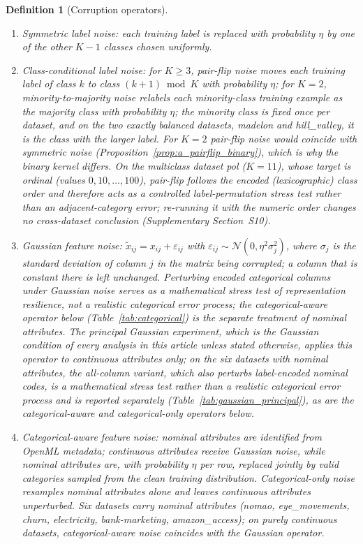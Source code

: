 \documentclass[pdflatex,sn-mathphys]{sn-jnl}
\theoremstyle{thmstyleone}
\theoremstyle{thmstyletwo}
\theoremstyle{thmstylethree}
\newtheorem{definition}{Definition}
\begin{document}
\begin{definition}[Corruption operators]\label{def:operators}
\begin{enumerate}
\item \emph{Symmetric label noise}: each training label is replaced with probability $\eta$ by one of the other $K-1$ classes chosen uniformly.
\item \emph{Class-conditional label noise}: for $K\ge3$, \emph{pair-flip} noise moves each training label of class $k$ to class $(k+1)\bmod K$ with probability $\eta$; for $K=2$, \emph{minority-to-majority} noise relabels each minority-class training example as the majority class with probability $\eta$; the minority class is fixed once per dataset, and on the two exactly balanced datasets, madelon and hill\_valley, it is the class with the larger label. For $K=2$ pair-flip noise would coincide with symmetric noise (Proposition~\ref{prop:a_pairflip_binary}), which is why the binary kernel differs. On the multiclass dataset pol ($K=11$), whose target is ordinal (values $0,10,\dots,100$), pair-flip follows the encoded (lexicographic) class order and therefore acts as a controlled label-permutation stress test rather than an adjacent-category error; re-running it with the numeric order changes no cross-dataset conclusion (Supplementary Section~S10).
\item \emph{Gaussian feature noise}: $\tilde x_{ij}=x_{ij}+\varepsilon_{ij}$ with $\varepsilon_{ij}\sim\mathcal{N}(0,\eta^{2}\sigma_j^{2})$, where $\sigma_j$ is the standard deviation of column $j$ in the matrix being corrupted; a column that is constant there is left unchanged. Perturbing encoded categorical columns under Gaussian noise serves as a mathematical stress test of representation resilience, not a realistic categorical error process; the categorical-aware operator below (Table~\ref{tab:categorical}) is the separate treatment of nominal attributes. The principal Gaussian experiment, which is the Gaussian condition of every analysis in this article unless stated otherwise, applies this operator to continuous attributes only; on the six datasets with nominal attributes, the all-column variant, which also perturbs label-encoded nominal codes, is a mathematical stress test rather than a realistic categorical error process and is reported separately (Table~\ref{tab:gaussian_principal}), as are the categorical-aware and categorical-only operators below.
\item \emph{Categorical-aware feature noise}: nominal attributes are identified from OpenML metadata; continuous attributes receive Gaussian noise, while nominal attributes are, with probability $\eta$ per row, replaced jointly by valid categories sampled from the clean training distribution. \emph{Categorical-only noise} resamples nominal attributes alone and leaves continuous attributes unperturbed. Six datasets carry nominal attributes (nomao, eye\_movements, churn, electricity, bank-marketing, amazon\_access); on purely continuous datasets, categorical-aware noise coincides with the Gaussian operator.

\end{enumerate}
\end{definition}
\end{document}
